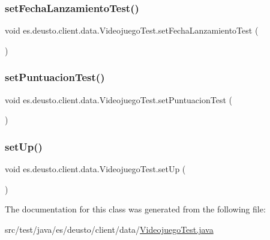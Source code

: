 \subsubsection{\texorpdfstring{setFechaLanzamientoTest()}{setFechaLanzamientoTest()}}
{\footnotesize\ttfamily void es.\+deusto.\+client.\+data.\+Videojuego\+Test.\+set\+Fecha\+Lanzamiento\+Test (\begin{DoxyParamCaption}{ }\end{DoxyParamCaption})}

\mbox{\label{classes_1_1deusto_1_1client_1_1data_1_1_videojuego_test_a75e2fffd21c969b532d80d4fe2ba836d}} 
\subsubsection{\texorpdfstring{setPuntuacionTest()}{setPuntuacionTest()}}
{\footnotesize\ttfamily void es.\+deusto.\+client.\+data.\+Videojuego\+Test.\+set\+Puntuacion\+Test (\begin{DoxyParamCaption}{ }\end{DoxyParamCaption})}

\mbox{\label{classes_1_1deusto_1_1client_1_1data_1_1_videojuego_test_afe20cac61bf93a60aa7c73cb28aa1df7}} 
\subsubsection{\texorpdfstring{setUp()}{setUp()}}
{\footnotesize\ttfamily void es.\+deusto.\+client.\+data.\+Videojuego\+Test.\+set\+Up (\begin{DoxyParamCaption}{ }\end{DoxyParamCaption})}



The documentation for this class was generated from the following file\+:\begin{DoxyCompactItemize}
\item 
src/test/java/es/deusto/client/data/\mbox{\hyperlink{_videojuego_test_8java}{Videojuego\+Test.\+java}}\end{DoxyCompactItemize}
